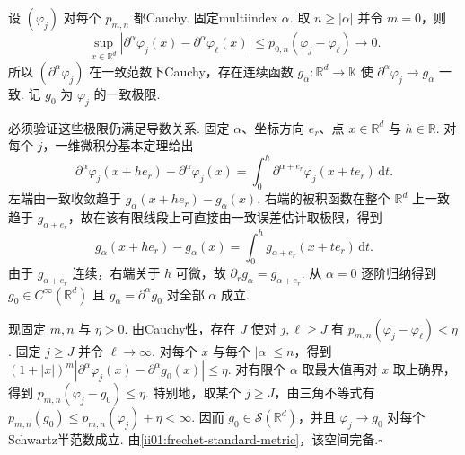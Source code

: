 \begin{FAProof}
设 \(\displaystyle (\varphi_j)\) 对每个 \(\displaystyle p_{m,n}\) 都Cauchy. 固定multiindex \(\displaystyle \alpha\). 取 \(\displaystyle n\geqslant|\alpha|\) 并令 \(\displaystyle m=0\)，则
\[
\sup_{x\in\mathbb R^d}
|\partial^\alpha\varphi_j(x)-\partial^\alpha\varphi_\ell(x)|
\leqslant
p_{0,n}(\varphi_j-\varphi_\ell)
\to0.
\]
所以 \(\displaystyle (\partial^\alpha\varphi_j)\) 在一致范数下Cauchy，存在连续函数 \(\displaystyle g_\alpha:\mathbb R^d\to\mathbb K\) 使 \(\displaystyle \partial^\alpha\varphi_j\to g_\alpha\) 一致. 记 \(\displaystyle g_0\) 为 \(\displaystyle \varphi_j\) 的一致极限.

必须验证这些极限仍满足导数关系. 固定 \(\displaystyle \alpha\)、坐标方向 \(\displaystyle e_r\)、点 \(\displaystyle x\in\mathbb R^d\) 与 \(\displaystyle h\in\mathbb R\). 对每个 \(\displaystyle j\)，一维微积分基本定理给出
\[
\partial^\alpha\varphi_j(x+he_r)
-
\partial^\alpha\varphi_j(x)
=
\int_0^h
\partial^{\alpha+e_r}\varphi_j(x+te_r)\,\mathrm{d}t.
\]
左端由一致收敛趋于 \(\displaystyle g_\alpha(x+he_r)-g_\alpha(x)\). 右端的被积函数在整个 \(\displaystyle \mathbb R^d\) 上一致趋于 \(\displaystyle g_{\alpha+e_r}\)，故在该有限线段上可直接由一致误差估计取极限，得到
\[
g_\alpha(x+he_r)-g_\alpha(x)
=
\int_0^h g_{\alpha+e_r}(x+te_r)\,\mathrm{d}t.
\]
由于 \(\displaystyle g_{\alpha+e_r}\) 连续，右端关于 \(\displaystyle h\) 可微，故 \(\displaystyle \partial_r g_\alpha=g_{\alpha+e_r}\). 从 \(\displaystyle \alpha=0\) 逐阶归纳得到 \(\displaystyle g_0\in C^\infty(\mathbb R^d)\) 且 \(\displaystyle g_\alpha=\partial^\alpha g_0\) 对全部 \(\displaystyle \alpha\) 成立.

现固定 \(\displaystyle m,n\) 与 \(\displaystyle \eta>0\). 由Cauchy性，存在 \(\displaystyle J\) 使对 \(\displaystyle j,\ell\geqslant J\) 有 \(\displaystyle p_{m,n}(\varphi_j-\varphi_\ell)<\eta\). 固定 \(\displaystyle j\geqslant J\) 并令 \(\displaystyle \ell\to\infty\). 对每个 \(\displaystyle x\) 与每个 \(\displaystyle |\alpha|\leqslant n\)，得到
\(\displaystyle (1+|x|)^m |\partial^\alpha\varphi_j(x)-\partial^\alpha g_0(x)| \leqslant\eta.\)
对有限个 \(\displaystyle \alpha\) 取最大值再对 \(\displaystyle x\) 取上确界，得到
\(\displaystyle p_{m,n}(\varphi_j-g_0) \leqslant\eta.\)
特别地，取某个 \(\displaystyle j\geqslant J\)，由三角不等式有 \(\displaystyle p_{m,n}(g_0)\leqslant p_{m,n}(\varphi_j)+\eta<\infty\). 因而 \(\displaystyle g_0\in\mathcal S(\mathbb R^d)\)，并且 \(\displaystyle \varphi_j\to g_0\) 对每个Schwartz半范数成立. 由\autoref{ii01:frechet-standard-metric}，该空间完备.\hfill\(\square\)
\end{FAProof}

